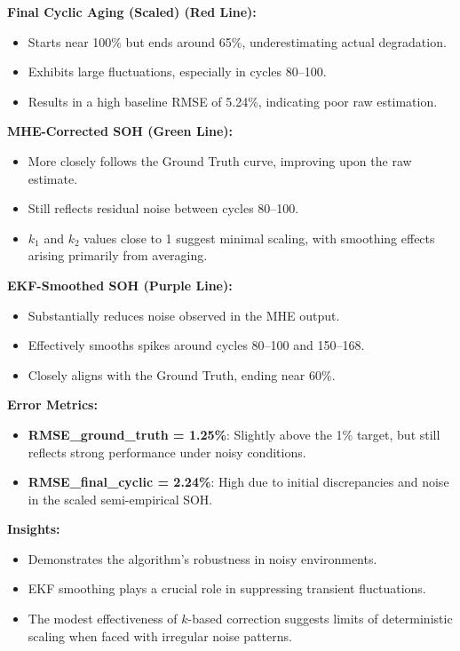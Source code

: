 \vspace{0.5em}
\textbf{Final Cyclic Aging (Scaled) (Red Line):}
\begin{itemize}
    \item Starts near 100\% but ends around 65\%, underestimating actual degradation.
    \item Exhibits large fluctuations, especially in cycles 80--100.
    \item Results in a high baseline RMSE of 5.24\%, indicating poor raw estimation.
\end{itemize}

\vspace{0.5em}
\textbf{MHE-Corrected SOH (Green Line):}
\begin{itemize}
    \item More closely follows the Ground Truth curve, improving upon the raw estimate.
    \item Still reflects residual noise between cycles 80--100.
    \item $k_1$ and $k_2$ values close to 1 suggest minimal scaling, with smoothing effects arising primarily from averaging.
\end{itemize}

\vspace{0.5em}
\textbf{EKF-Smoothed SOH (Purple Line):}
\begin{itemize}
    \item Substantially reduces noise observed in the MHE output.
    \item Effectively smooths spikes around cycles 80--100 and 150--168.
    \item Closely aligns with the Ground Truth, ending near 60\%.
\end{itemize}

\vspace{0.5em}
\textbf{Error Metrics:}
\begin{itemize}
    \item \textbf{RMSE\_ground\_truth = 1.25\%}: Slightly above the 1\% target, but still reflects strong performance under noisy conditions.
    \item \textbf{RMSE\_final\_cyclic = 2.24\%}: High due to initial discrepancies and noise in the scaled semi-empirical SOH.
\end{itemize}

\vspace{0.5em}
\textbf{Insights:}
\begin{itemize}
    \item Demonstrates the algorithm’s robustness in noisy environments.
    \item EKF smoothing plays a crucial role in suppressing transient fluctuations.
    \item The modest effectiveness of $k$-based correction suggests limits of deterministic scaling when faced with irregular noise patterns.
\end{itemize}

